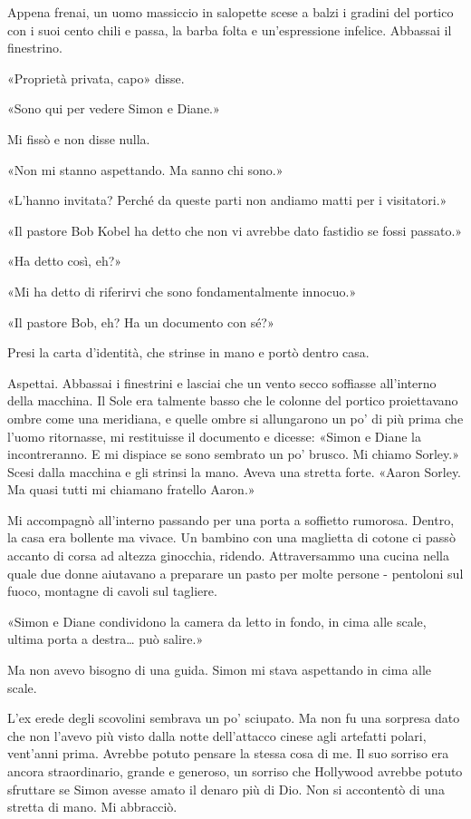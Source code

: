 Appena frenai, un uomo massiccio in salopette scese a balzi i gradini
del portico con i suoi cento chili e passa, la barba folta e
un'espressione infelice. Abbassai il finestrino.

«Proprietà privata, capo» disse.

«Sono qui per vedere Simon e Diane.»

Mi fissò e non disse nulla.

«Non mi stanno aspettando. Ma sanno chi sono.»

«L'hanno invitata? Perché da queste parti non andiamo matti per i
visitatori.»

«Il pastore Bob Kobel ha detto che non vi avrebbe dato fastidio se fossi
passato.»

«Ha detto così, eh?»

«Mi ha detto di riferirvi che sono fondamentalmente innocuo.»

«Il pastore Bob, eh? Ha un documento con sé?»

Presi la carta d'identità, che strinse in mano e portò dentro casa.

Aspettai. Abbassai i finestrini e lasciai che un vento secco soffiasse
all'interno della macchina. Il Sole era talmente basso che le colonne
del portico proiettavano ombre come una meridiana, e quelle ombre si
allungarono un po' di più prima che l'uomo ritornasse, mi restituisse il
documento e dicesse: «Simon e Diane la incontreranno. E mi dispiace se
sono sembrato un po' brusco. Mi chiamo Sorley.» Scesi dalla macchina e
gli strinsi la mano. Aveva una stretta forte. «Aaron Sorley. Ma quasi
tutti mi chiamano fratello Aaron.»

Mi accompagnò all'interno passando per una porta a soffietto rumorosa.
Dentro, la casa era bollente ma vivace. Un bambino con una maglietta di
cotone ci passò accanto di corsa ad altezza ginocchia, ridendo.
Attraversammo una cucina nella quale due donne aiutavano a preparare un
pasto per molte persone - pentoloni sul fuoco, montagne di cavoli sul
tagliere.

«Simon e Diane condividono la camera da letto in fondo, in cima alle
scale, ultima porta a destra\ldots{} può salire.»

Ma non avevo bisogno di una guida. Simon mi stava aspettando in cima
alle scale.

L'ex erede degli scovolini sembrava un po' sciupato. Ma non fu una
sorpresa dato che non l'avevo più visto dalla notte dell'attacco cinese
agli artefatti polari, vent'anni prima. Avrebbe potuto pensare la stessa
cosa di me. Il suo sorriso era ancora straordinario, grande e generoso,
un sorriso che Hollywood avrebbe potuto sfruttare se Simon avesse amato
il denaro più di Dio. Non si accontentò di una stretta di mano. Mi
abbracciò.

